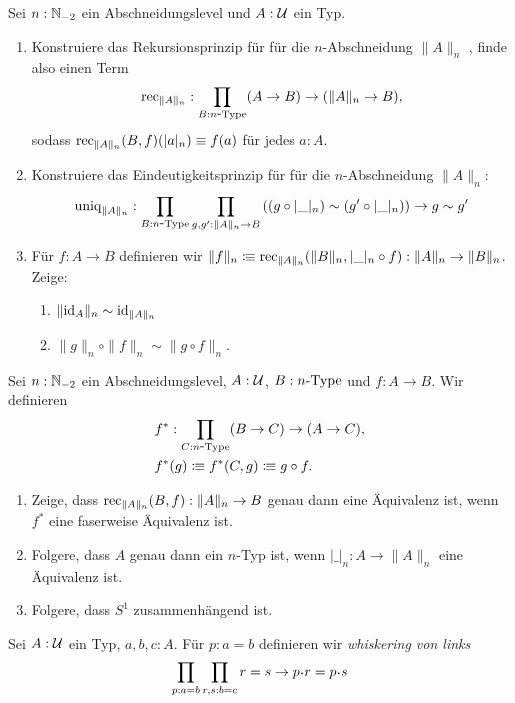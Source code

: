 \documentclass{uebung}
\begin{document}

\begin{exercise}
  Sei $n:\mathbb{N}_{-2}$ ein Abschneidungslevel und $A:\mathcal{U}$ ein Typ.
  \begin{enumerate}
    \item Konstruiere das Rekursionsprinzip für für die $n$-Abschneidung $\|A\|_n$ , finde also einen Term
      $$
      \mathrm{rec}_{\|A\|_n}:\prod_{B:n\mbox{-}\mathrm{Type}}(A \to B) \to (\|A\|_n \to B),
      $$
      sodass $\mathrm{rec}_{\|A\|_n}(B,f)(|a|_n) \equiv f(a)$ für jedes $a:A$.
    \item Konstruiere das Eindeutigkeitsprinzip für für die $n$-Abschneidung $\|A\|_n$:
      $$
      \mathrm{uniq}_{\|A\|_n}:\prod_{B:n\mbox{-}\mathrm{Type}}\prod_{g,g':\|A\|_n \to B} \left((g\circ |\_|_n) \sim (g'\circ |\_|_n)\right) \to g \sim g'
      $$
    \item
  Für $f:A\to B$ definieren wir $\|f\|_n\vcentcolon\mspace{-1.2mu}\equiv \mathrm{rec}_{\|A\|_n}(\|B\|_n,|\_|_n\circ f):\|A\|_n\to\|B\|_n$.
  Zeige:
  \begin{enumerate}
    \item $\|\mathrm{id}_A\|_n\sim \mathrm{id}_{\|A\|_n}$
    \item $\|g\|_n\circ\|f\|_n\sim\|g \circ f\|_n$.
  \end{enumerate}
  \end{enumerate}
\end{exercise}


\begin{exercise}
  Sei $n:\mathbb{N}_{-2}$ ein Abschneidungslevel, $A:\mathcal{U}$, $B:n\mbox{-}\mathrm{Type}$ und $f:A\to B$.
  Wir definieren
  \begin{align*}
    &f^*:\prod_{C:n\mbox{-}\mathrm{Type}}(B \to C) \to (A \to C),\\
    &f^*(g)\vcentcolon\mspace{-1.2mu}\equiv f^*(C,g)\vcentcolon\mspace{-1.2mu}\equiv g\circ f.
  \end{align*}
  \begin{enumerate}
    \item Zeige, dass $\mathrm{rec}_{\|A\|_n}(B,f):\|A\|_n\to B$ genau dann eine Äquivalenz ist, wenn $f^*$ eine faserweise Äquivalenz ist.
    \item Folgere, dass $A$ genau dann ein $n$-Typ ist, wenn $|\_|_n:A\to \|A\|_n$ eine Äquivalenz ist.
    \item Folgere, dass $S^1$ zusammenhängend ist.
  \end{enumerate}
\end{exercise}

\begin{exercise}
  Sei $A:\mathcal{U}$ ein Typ, $a,b,c:A$.
  Für $p:a=b$ definieren wir \emph{whiskering von links}
  \begin{align*}
    \prod_{p:a=b}\prod_{r,s:b=c}r=s\to p\kon r=p\kon s\\
  \end{align*}
\end{exercise}
\end{document}

